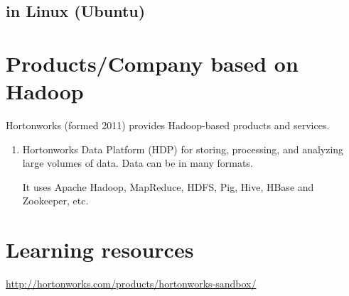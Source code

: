 \subsection{in Linux (Ubuntu)}


\section{Products/Company based on Hadoop}

Hortonworks (formed 2011) provides Hadoop-based products and services.
\begin{enumerate}
  \item Hortonworks Data Platform (HDP) for  storing,
  processing, and analyzing large volumes of data. Data can be in many formats.
  
  It uses Apache Hadoop, MapReduce, HDFS, Pig, Hive, HBase and Zookeeper, etc.
  
  
\end{enumerate}

\section{Learning resources}

\url{http://hortonworks.com/products/hortonworks-sandbox/}